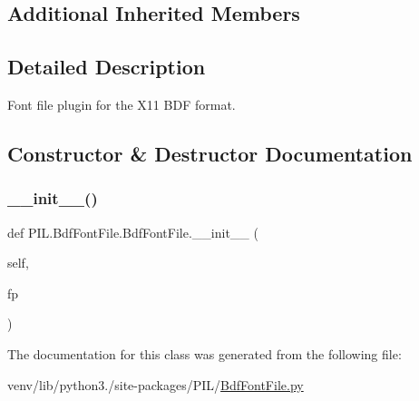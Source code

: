 \subsection*{Additional Inherited Members}


\subsection{Detailed Description}
\begin{DoxyVerb}Font file plugin for the X11 BDF format.\end{DoxyVerb}
 

\subsection{Constructor \& Destructor Documentation}
\mbox{\label{classPIL_1_1BdfFontFile_1_1BdfFontFile_ada04488978c5952212889588238871d6}} 
\subsubsection{\texorpdfstring{\+\_\+\+\_\+init\+\_\+\+\_\+()}{\_\_init\_\_()}}
{\footnotesize\ttfamily def P\+I\+L.\+Bdf\+Font\+File.\+Bdf\+Font\+File.\+\_\+\+\_\+init\+\_\+\+\_\+ (\begin{DoxyParamCaption}\item[{}]{self,  }\item[{}]{fp }\end{DoxyParamCaption})}



The documentation for this class was generated from the following file\+:\begin{DoxyCompactItemize}
\item 
venv/lib/python3./site-\/packages/\+P\+I\+L/\hyperlink{BdfFontFile_8py}{Bdf\+Font\+File.\+py}\end{DoxyCompactItemize}
